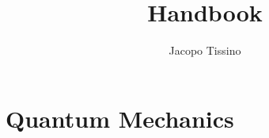 \documentclass[a4paper, 12pt]{report}
\title{Handbook}
\author{Jacopo Tissino}
\begin{document}
\maketitle


%


%

\chapter{Quantum Mechanics}


\end{document}
